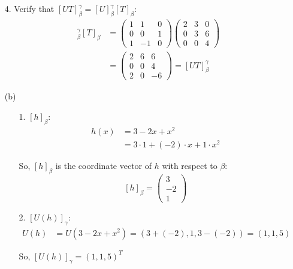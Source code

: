 \documentclass{article}
\begin{document}
\begin{enumerate}
\begin{enumerate}
\item[4.] Verify that $[UT]_{\beta}^{\gamma} = [U]_{\beta}^{\gamma}[T]_{\beta}$:
\begin{align*}
[U]_{\beta}^{\gamma}[T]_{\beta} &= 
\begin{pmatrix}
1 & 1 & 0 \\
0 & 0 & 1 \\
1 & -1 & 0
\end{pmatrix}
\begin{pmatrix}
2 & 3 & 0 \\
0 & 3 & 6 \\
0 & 0 & 4
\end{pmatrix} \\
&= 
\begin{pmatrix}
2 & 6 & 6 \\
0 & 0 & 4 \\
2 & 0 & -6
\end{pmatrix} = [UT]_{\beta}^{\gamma}
\end{align*}

\item[(b)]

\begin{enumerate}
\item[1.] $[h]_{\beta}$:
\begin{align*}
h(x) &= 3 - 2x + x^2 \\
&= 3 \cdot 1 + (-2) \cdot x + 1 \cdot x^2
\end{align*}

So, $[h]_{\beta}$ is the coordinate vector of $h$ with respect to $\beta$:
$$[h]_{\beta} = 
\begin{pmatrix}
3 \\
-2 \\
1
\end{pmatrix}$$

\item[2.] $[U(h)]_{\gamma}$:
\begin{align*}
U(h) &= U(3-2x+x^2) = (3+(-2), 1, 3-(-2)) = (1, 1, 5)
\end{align*}

So, $[U(h)]_{\gamma} = (1, 1, 5)^T$ \\


\end{enumerate}
\end{enumerate}
\end{enumerate}
\end{document}
